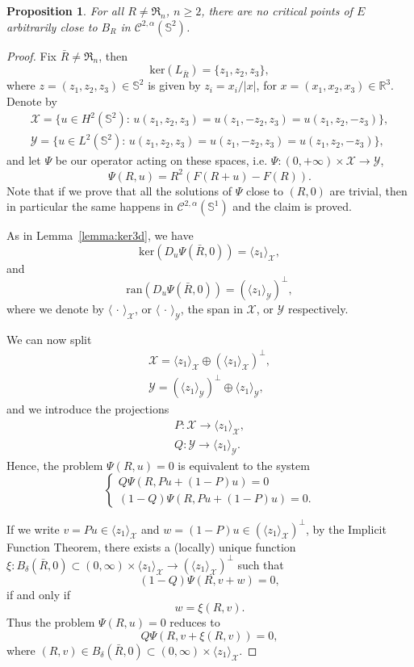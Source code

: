 \documentclass[10pt,reqno,english]{amsart}
\newcommand{\Sd}{\mathbb{S}^2}
\newcommand{\Su}{\mathbb{S}^1}
\newcommand{\rn}{{\mathfrak R}_n  }
\newcommand{\R} {\mathbb R}
\newtheorem{prop}[lemma]{Proposition}
\theoremstyle{definition}
\numberwithin{equation}{section}
\begin{document}
\begin{prop}
\label{prop:nobif3D}
For all $R\not=\rn$, $n\ge2$, there are no critical points of $E$ arbitrarily close to $B_R$ in $\mathcal C^{2,\alpha}(\Sd)$.
\end{prop}
\begin{proof}
Fix $\bar R\not=\rn$, then
\[
\mathrm{ker}(L_{\bar R})=\{z_1,z_2,z_3\},
\]
where $z=(z_1,z_2,z_3)\in\Sd$ is given by $z_i=x_i/|x|$, for $x=(x_1,x_2,x_3)\in\R^3$.
Denote by
\begin{gather*}
\mathcal X=\{u\in H^2(\Sd):\,u(z_1,z_2,z_3)=u(z_1,-z_2,z_3)=u(z_1,z_2,-z_3)\},\\
\mathcal Y=\{u\in L^2(\Sd):\,u(z_1,z_2,z_3)=u(z_1,-z_2,z_3)=u(z_1,z_2,-z_3)\},
\end{gather*}
and let $\Psi$ be our operator acting on these spaces, i.e. $\Psi:(0,+\infty)\times\mathcal X\to\mathcal Y$,
\[
\Psi(R,u)=R^2(F(R+u)-F(R)).
\]
Note that if we prove that all the solutions of $\Psi$ close to $(R,0)$ are trivial, then in particular the same happens in $\mathcal C^{2,\alpha}(\Su)$ and the claim is proved.

As in Lemma~\ref{lemma:ker3d}, we have
\[
\mathrm{ker}(D_u\Psi(\bar R,0))=\langle{z_1}\rangle_{\mathcal X},
\]
and
\[
\mathrm{ran}(D_u\Psi(\bar R,0))=(\langle{z_1}\rangle_{\mathcal Y})^\perp,
\]
where we denote by $\langle{\,\cdot\,}\rangle_{\mathcal X}$, or $\langle{\,\cdot\,}\rangle_{\mathcal Y}$, the span in $\mathcal X$, or $\mathcal Y$ respectively.

We can now split
\begin{gather*}
\mathcal X= \langle{z_1}\rangle_{\mathcal X}\oplus(\langle{z_1}\rangle_{\mathcal X})^\perp,\\
\mathcal Y= (\langle{z_1}\rangle_{\mathcal Y})^\perp\oplus\langle{z_1}\rangle_{\mathcal Y},
\end{gather*}
and we introduce the projections
\begin{gather*}
P:\mathcal X\to  \langle{z_1}\rangle_{\mathcal X},\\
Q:\mathcal Y\to \langle{z_1}\rangle_{\mathcal Y}.
\end{gather*}
Hence, the problem $\Psi(R,u)=0$ is equivalent to the system
\[
\begin{cases}
Q \Psi(R,Pu+(1-P)u)=0 \\
(1-Q)\Psi(R,Pu+(1-P)u)=0.
\end{cases}
\]

If we write $v=Pu\in \langle z_1\rangle_{\mathcal{X}}$ and $w=(1-P)u\in(\langle z_1\rangle_{\mathcal{X}})^\perp$, by the Implicit Function Theorem, there exists a (locally) unique function $\xi:B_\delta(\bar R,0)\subset(0,\infty)\times\langle z_1\rangle_{\mathcal{X}}\to(\langle z_1\rangle_{\mathcal{X}})^\perp$ such that
\[
(1-Q)\Psi(R,v+w)=0,
\]
if and only if
\[
w=\xi(R,v).
\]
Thus the problem $\Psi(R,u)=0$ reduces to 
\begin{equation}
\label{eqridotta1}
Q\Psi(R,v+\xi(R,v))=0,
\end{equation}
where $(R,v)\in B_\delta(\bar R,0)\subset(0,\infty)\times\langle z_1\rangle_{\mathcal{X}}$.


\end{proof}
\end{document}
